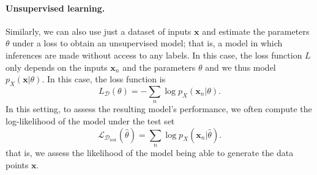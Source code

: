 \paragraph*{Unsupervised learning.} Similarly, we can also use just a
dataset of inputs $\bm{x}$ and estimate the parameters $\theta$ under a loss to
obtain an unsupervised model; that is, a model in which inferences are made
without access to any labels. In this case, the loss function $L$ only
depends on the inputs $\bm{x}_n$ and the parameters $\theta$
and we thus model $p_X(\bm{x}|\theta)$.
In this case, the loss function is
%
\begin{equation}
    L_\mathcal{D}\left(\theta\right)=-\sum_n\log p_X\left(\bm{x}_n|\theta\right).
\end{equation}
%
In this setting, to assess the resulting model's performance,
we often compute the log-likelihood of the model under the test set
%
\begin{equation}
    \mathcal{L}_{\mathcal{D}_\text{test}}(\hat{\theta}) =
    \sum_n\log p_X\left(\bm{x}_n|\hat{\theta}\right).
\end{equation}
%
that is, we assess the likelihood of the model being able to generate
the data points $\bm{x}$.

